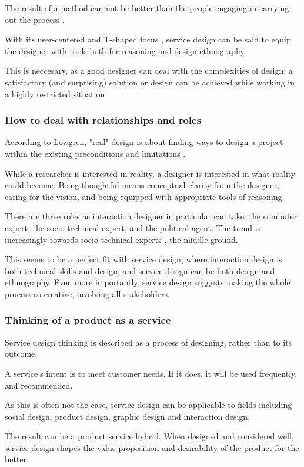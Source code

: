 The result of a method can not be better than the people engaging in carrying out the process \cite{lowgren}.

With its user-centered and T-shaped focus \cite{stickdorn}, service design can be said to equip the designer with tools both for reasoning and design ethnography.

This is neccesary, as a good designer can deal with the complexities of design: a satisfactory (and surprising) solution or design can be achieved while working in a highly restricted situation.

\subsubsection{How to deal with relationships and roles}
According to Löwgren, "real" design is about finding ways to design a project within the existing preconditions and limitations \cite{lowgren}.

While a researcher is interested in reality, a designer is interested in what reality could become. \cite{lowgren} Being thoughtful means conceptual clarity from the designer, caring for the vision, and being equipped with appropriate tools of reasoning.

There are three roles as interaction designer in particular can take: the computer expert, the socio-technical expert, and the political agent. The trend is increasingly towards socio-technical experts \cite{lowgren}, the middle ground.

This seems to be a perfect fit with service design, where interaction design is both technical skills and design, and service design can be both design and ethnography. Even more importantly, service design suggests making the whole process co-creative, involving all stakeholders. \cite{stickdorn}

\subsubsection{Thinking of a product as a service}

Service design thinking is described as a process of designing, rather than to its outcome.

A service's intent is to meet customer needs. If it does, it will be used frequently, and recommended. \cite{stickdorn}

As this is often not the case, service design can be applicable to fields including social design, product design, graphic design and interaction design.

The result can be a product service hybrid. When designed and considered well, service design shapes the value proposition and desirability of the product for the better.
